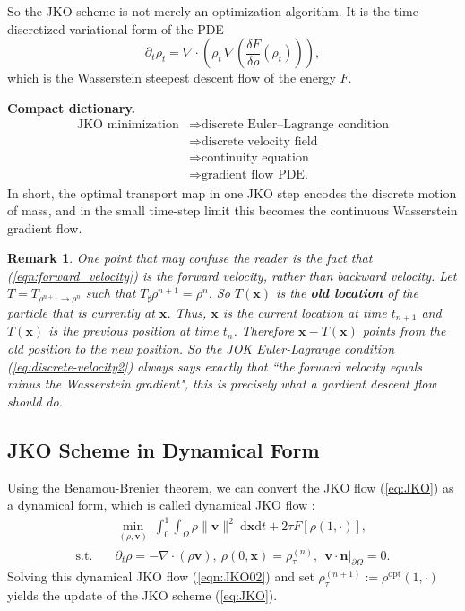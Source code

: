 \documentclass[11pt]{book}
\newtheorem{remark}[theorem]{Remark}
\newcommand{\reff}[1]{{\rm (\ref{#1})}}
\newcommand{\dx}{\mathrm{d}\mathbf{x}}
\newcommand{\dt}{\mathrm{d}t}
\newcommand{\bx}{\mathbf x}
\newcommand{\deldrho}[1]{\frac{\delta #1}{\delta\rho}}
\begin{document}
So the JKO scheme is not merely an optimization algorithm. It is the time-discretized variational form of the PDE
\[
\partial_t\rho_t = \nabla\cdot\left(\rho_t\,\nabla\!\left(\deldrho{F}(\rho_t)\right)\right),
\]
which is the Wasserstein steepest descent flow of the energy $F$.

\begin{summarybox}
\textbf{Compact dictionary.}
\[
\begin{aligned}
\text{JKO minimization}
&\Longrightarrow \text{discrete Euler--Lagrange condition}\\
&\Longrightarrow \text{discrete velocity field}\\
&\Longrightarrow \text{continuity equation}\\
&\Longrightarrow \text{gradient flow PDE.}
\end{aligned}
\]
In short, the optimal transport map in one JKO step encodes the discrete motion of mass, and in the small time-step limit this becomes the continuous Wasserstein gradient flow.
\end{summarybox}


\begin{remark}
    One point that may confuse the reader is the fact that \reff{eqn:forward_velocity} is the forward velocity, rather than backward velocity. Let $T=T_{\rho^{n+1}\to \rho^n}$ such that $T_{\sharp}\rho^{n+1} = \rho^n$. So $T(\bx)$ is the {\bf{old location}} of the particle that is currently at $\bx$. Thus, $\bx$ is the current location at time $t_{n+1}$ and $T(\bx)$ is the previous position at time $t_n$. Therefore $\bx - T(\bx)$ points from the old position to the new position. So the JOK Euler-Lagrange condition \reff{eq:discrete-velocity2} always says exactly that ``the forward velocity equals minus the Wasserstein gradient", this is precisely what a gardient descent flow should do.
\end{remark}






\subsection{JKO Scheme in Dynamical Form}


Using the Benamou-Brenier theorem, we can convert the JKO flow (\ref{eq:JKO}) as a dynamical form, which is called dynamical JKO flow \cite{carrillo2022primal}:
\begin{equation}\label{eqn:JKO02}
  \begin{aligned}
  &    \min_{(\rho,\mathbf{v})}\  \int_0^1\int_{\Omega} \rho \|\mathbf{v}\|^2 \ \dx\dt + 2\tau F[\rho(1,\cdot)], \\
  \text{s.t.} \quad & \partial_t\rho = -\nabla\cdot(\rho \mathbf{v}),\ \rho(0,\mathbf{x})=\rho_{\tau}^{(n)},\ \ \mathbf{v}\cdot \mathbf{n}|_{\partial \Omega} = 0.
  \end{aligned}
\end{equation}
Solving this dynamical JKO flow (\ref{eqn:JKO02}) and set $\rho_{\tau}^{(n+1)}:=\rho^{\mathrm{opt}}(1,\cdot)$ yields the update of the JKO scheme (\ref{eq:JKO}).
\end{document}
